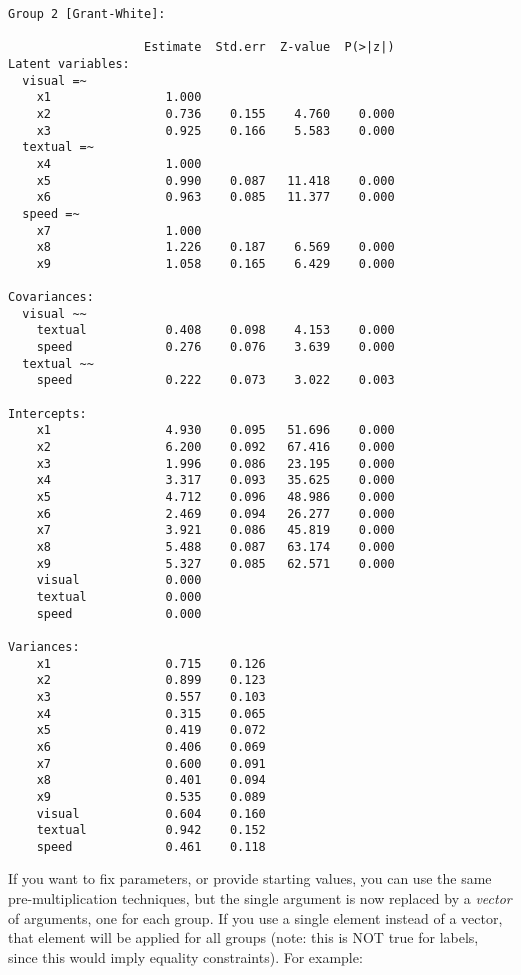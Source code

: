 \begin{verbatim}
Group 2 [Grant-White]:

                   Estimate  Std.err  Z-value  P(>|z|)
Latent variables:
  visual =~
    x1                1.000
    x2                0.736    0.155    4.760    0.000
    x3                0.925    0.166    5.583    0.000
  textual =~
    x4                1.000
    x5                0.990    0.087   11.418    0.000
    x6                0.963    0.085   11.377    0.000
  speed =~
    x7                1.000
    x8                1.226    0.187    6.569    0.000
    x9                1.058    0.165    6.429    0.000

Covariances:
  visual ~~
    textual           0.408    0.098    4.153    0.000
    speed             0.276    0.076    3.639    0.000
  textual ~~
    speed             0.222    0.073    3.022    0.003

Intercepts:
    x1                4.930    0.095   51.696    0.000
    x2                6.200    0.092   67.416    0.000
    x3                1.996    0.086   23.195    0.000
    x4                3.317    0.093   35.625    0.000
    x5                4.712    0.096   48.986    0.000
    x6                2.469    0.094   26.277    0.000
    x7                3.921    0.086   45.819    0.000
    x8                5.488    0.087   63.174    0.000
    x9                5.327    0.085   62.571    0.000
    visual            0.000
    textual           0.000
    speed             0.000

Variances:
    x1                0.715    0.126
    x2                0.899    0.123
    x3                0.557    0.103
    x4                0.315    0.065
    x5                0.419    0.072
    x6                0.406    0.069
    x7                0.600    0.091
    x8                0.401    0.094
    x9                0.535    0.089
    visual            0.604    0.160
    textual           0.942    0.152
    speed             0.461    0.118
\end{verbatim}

If you want to fix parameters, or provide starting values, you can use
the same pre-multiplication techniques, but the single argument is now
replaced by a \emph{vector} of arguments, one for each group. If you use
a single element instead of a vector, that element will be applied for
all groups (note: this is NOT true for labels, since this would imply
equality constraints). For example:

\begin{Shaded}
\begin{Highlighting}[]
\end{Highlighting}
\end{Shaded}

